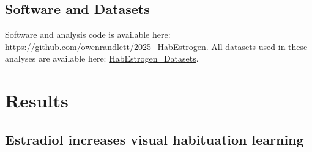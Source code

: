 \documentclass[9.5pt,lineno]{RandlettLab_elife}
\begin{document}
\subsection{Software and Datasets}

Software and analysis code is available here:  \href{https://github.com/owenrandlett/2025_HabEstrogen}{https://github.com/owenrandlett/2025\_HabEstrogen}. 
All datasets used in these analyses are available here: \href{https://gofile.me/5sdws/xF6oQhqTA}{HabEstrogen\_Datasets}.


\section{Results}

\subsection{Estradiol increases visual habituation learning}
\end{document}
